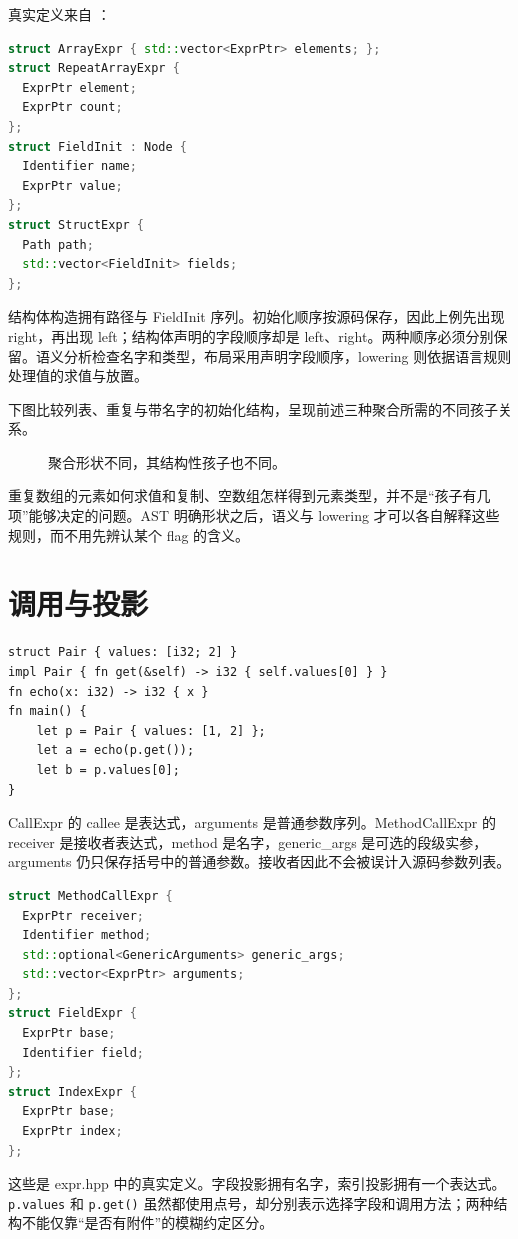 真实定义来自 ：
\begin{lstlisting}[language=C++]
struct ArrayExpr { std::vector<ExprPtr> elements; };
struct RepeatArrayExpr {
  ExprPtr element;
  ExprPtr count;
};
struct FieldInit : Node {
  Identifier name;
  ExprPtr value;
};
struct StructExpr {
  Path path;
  std::vector<FieldInit> fields;
};
\end{lstlisting}
结构体构造拥有路径与 FieldInit 序列。初始化顺序按源码保存，因此上例先出现 right，再出现 left；结构体声明的字段顺序却是 left、right。两种顺序必须分别保留。语义分析检查名字和类型，布局采用声明字段顺序，lowering 则依据语言规则处理值的求值与放置。

下图比较列表、重复与带名字的初始化结构，呈现前述三种聚合所需的不同孩子关系。
\begin{figure}[htbp]
\centering
{}
\caption{聚合形状不同，其结构性孩子也不同。}
\end{figure}
重复数组的元素如何求值和复制、空数组怎样得到元素类型，并不是“孩子有几项”能够决定的问题。AST 明确形状之后，语义与 lowering 才可以各自解释这些规则，而不用先辨认某个 flag 的含义。

\section{调用与投影}
\begin{lstlisting}[language=Rustless]
struct Pair { values: [i32; 2] }
impl Pair { fn get(&self) -> i32 { self.values[0] } }
fn echo(x: i32) -> i32 { x }
fn main() {
    let p = Pair { values: [1, 2] };
    let a = echo(p.get());
    let b = p.values[0];
}
\end{lstlisting}
CallExpr 的 callee 是表达式，arguments 是普通参数序列。MethodCallExpr 的 receiver 是接收者表达式，method 是名字，generic\_args 是可选的段级实参，arguments 仍只保存括号中的普通参数。接收者因此不会被误计入源码参数列表。
\begin{lstlisting}[language=C++]
struct MethodCallExpr {
  ExprPtr receiver;
  Identifier method;
  std::optional<GenericArguments> generic_args;
  std::vector<ExprPtr> arguments;
};
struct FieldExpr {
  ExprPtr base;
  Identifier field;
};
struct IndexExpr {
  ExprPtr base;
  ExprPtr index;
};
\end{lstlisting}
这些是 expr.hpp 中的真实定义。字段投影拥有名字，索引投影拥有一个表达式。\texttt{p.values} 和 \texttt{p.get()} 虽然都使用点号，却分别表示选择字段和调用方法；两种结构不能仅靠“是否有附件”的模糊约定区分。

